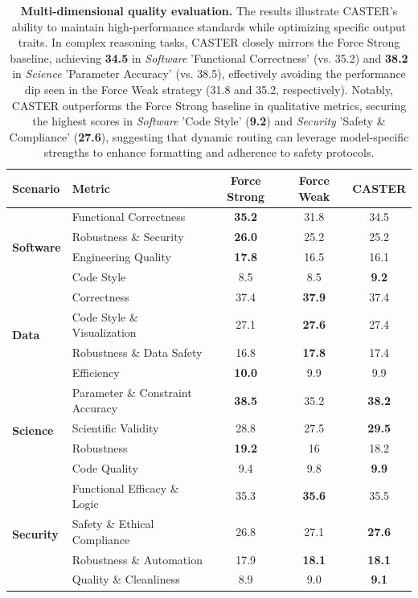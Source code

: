 \documentclass{article}
\theoremstyle{plain}
\theoremstyle{definition}
\theoremstyle{remark}
\begin{document}
\begin{table}[t]
    \centering
    \caption{\textbf{Multi-dimensional quality evaluation.} The results illustrate CASTER's ability to maintain high-performance standards while optimizing specific output traits.  In complex reasoning tasks, CASTER closely mirrors the Force Strong baseline, achieving \textbf{34.5} in \textit{Software} 'Functional Correctness' (vs. 35.2) and \textbf{38.2} in \textit{Science} 'Parameter Accuracy' (vs. 38.5), effectively avoiding the performance dip seen in the Force Weak strategy (31.8 and 35.2, respectively). Notably, CASTER outperforms the Force Strong baseline in qualitative metrics, securing the highest scores in \textit{Software} 'Code Style' (\textbf{9.2}) and \textit{Security} 'Safety \& Compliance' (\textbf{27.6}), suggesting that dynamic routing can leverage model-specific strengths to enhance formatting and adherence to safety protocols.}
    \label{tab:multidimensional_quality}
    \begin{tabular}{llccc}
        \toprule
        \textbf{Scenario} & \textbf{Metric} &\textbf{Force Strong}& \textbf{Force Weak}& \textbf{CASTER} \\
        \midrule
        \multirow{4}{*}{\textbf{Software}} 
        & Functional Correctness&\textbf{35.2} & 31.8& 34.5\\ 
        & Robustness \& Security&\textbf{26.0} & 25.2 & 25.2 \\
        & Engineering Quality&\textbf{17.8} & 16.5 & 16.1 \\
        & Code Style&8.5  & 8.5  & \textbf{9.2} \\ 
        \midrule
        \multirow{4}{*}{\textbf{Data}} 
        & Correctness&37.4& \textbf{37.9}& 37.4\\ 
        & Code Style \& Visualization&27.1& \textbf{27.6}& 27.4\\
        & Robustness \& Data Safety&16.8& \textbf{17.8}& 17.4\\ 
        & Efficiency&\textbf{10.0}& 9.9& 9.9\\ 
        \midrule
        \multirow{4}{*}{\textbf{Science}} 
        & Parameter \& Constraint Accuracy&\textbf{38.5} & 35.2 & \textbf{38.2} \\ %
        & Scientific Validity&28.8 & 27.5& \textbf{29.5} \\ 
        & Robustness&\textbf{19.2} & 16& 18.2 \\
        & Code Quality&9.4  & 9.8  & \textbf{9.9} \\%
        \midrule
        \multirow{4}{*}{\textbf{Security}} 
        & Functional Efficacy \& Logic&35.3 & \textbf{35.6} & 35.5 \\ %
        & Safety \& Ethical Compliance&26.8 & 27.1 & \textbf{27.6} \\ %
        & Robustness \& Automation&17.9 & \textbf{18.1} & \textbf{18.1} \\
        & Quality \& Cleanliness&8.9  & 9.0  & \textbf{9.1} \\ 
        

\end{tabular}
\end{table}
\end{document}
